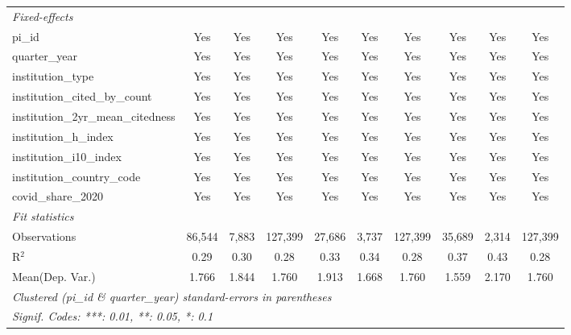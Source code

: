 \begin{tabular}{lccccccccc}
   \midrule
   \emph{Fixed-effects}\\
   pi\_id                                                      & Yes            & Yes            & Yes           & Yes            & Yes            & Yes           & Yes            & Yes            & Yes\\  
   quarter\_year                                               & Yes            & Yes            & Yes           & Yes            & Yes            & Yes           & Yes            & Yes            & Yes\\  
   institution\_type                                           & Yes            & Yes            & Yes           & Yes            & Yes            & Yes           & Yes            & Yes            & Yes\\  
   institution\_cited\_by\_count                               & Yes            & Yes            & Yes           & Yes            & Yes            & Yes           & Yes            & Yes            & Yes\\  
   institution\_2yr\_mean\_citedness                           & Yes            & Yes            & Yes           & Yes            & Yes            & Yes           & Yes            & Yes            & Yes\\  
   institution\_h\_index                                       & Yes            & Yes            & Yes           & Yes            & Yes            & Yes           & Yes            & Yes            & Yes\\  
   institution\_i10\_index                                     & Yes            & Yes            & Yes           & Yes            & Yes            & Yes           & Yes            & Yes            & Yes\\  
   institution\_country\_code                                  & Yes            & Yes            & Yes           & Yes            & Yes            & Yes           & Yes            & Yes            & Yes\\  
   covid\_share\_2020                                          & Yes            & Yes            & Yes           & Yes            & Yes            & Yes           & Yes            & Yes            & Yes\\  
   \midrule
   \emph{Fit statistics}\\
   Observations                                                & 86,544         & 7,883          & 127,399       & 27,686         & 3,737          & 127,399       & 35,689         & 2,314          & 127,399\\  
   R$^2$                                                       & 0.29           & 0.30           & 0.28          & 0.33           & 0.34           & 0.28          & 0.37           & 0.43           & 0.28\\  
Mean(Dep. Var.) & 1.766 & 1.844 & 1.760 & 1.913 & 1.668 & 1.760 & 1.559 & 2.170 & 1.760 \\
   \midrule \midrule
   \multicolumn{10}{l}{\emph{Clustered (pi\_id \& quarter\_year) standard-errors in parentheses}}\\
   \multicolumn{10}{l}{\emph{Signif. Codes: ***: 0.01, **: 0.05, *: 0.1}}\\
\end{tabular}
\par\endgroup
